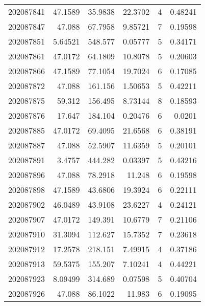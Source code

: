 \begin{tabular}{rrrrrr}
 202087841 &         47.1589  &       35.9838 &           22.3702  &           4 & 0.48241 \\
 202087847 &         47.088   &       67.7958 &            9.85721 &           7 & 0.19598 \\
 202087851 &          5.64521 &      548.577  &            0.05777 &           5 & 0.34171 \\
 202087861 &         47.0172  &       64.1809 &           10.8078  &           5 & 0.20603 \\
 202087866 &         47.1589  &       77.1054 &           19.7024  &           6 & 0.17085 \\
 202087872 &         47.088   &      161.156  &            1.50653 &           5 & 0.42211 \\
 202087875 &         59.312   &      156.495  &            8.73144 &           8 & 0.18593 \\
 202087876 &         17.647   &      184.104  &            0.20476 &           6 & 0.0201  \\
 202087885 &         47.0172  &       69.4095 &           21.6568  &           6 & 0.38191 \\
 202087887 &         47.088   &       52.5907 &           11.6359  &           5 & 0.20101 \\
 202087891 &          3.4757  &      444.282  &            0.03397 &           5 & 0.43216 \\
 202087896 &         47.088   &       78.2918 &           11.248   &           6 & 0.19598 \\
 202087898 &         47.1589  &       43.6806 &           19.3924  &           6 & 0.22111 \\
 202087902 &         46.0489  &       43.9108 &           23.6227  &           4 & 0.24121 \\
 202087907 &         47.0172  &      149.391  &           10.6779  &           7 & 0.21106 \\
 202087910 &         31.3094  &      112.627  &           15.7352  &           7 & 0.23618 \\
 202087912 &         17.2578  &      218.151  &            7.49915 &           4 & 0.37186 \\
 202087913 &         59.5375  &      155.207  &            7.10241 &           4 & 0.44221 \\
 202087923 &          8.09499 &      314.689  &            0.07598 &           5 & 0.40704 \\
 202087926 &         47.088   &       86.1022 &           11.983   &           6 & 0.19095 \\

\end{tabular}
